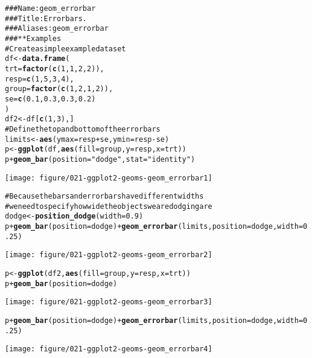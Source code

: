 \documentclass[a4paper,titlepage]{tufte-handout}\usepackage{graphicx, color}
\makeatletter
\def\maxwidth{ %
  \ifdim\Gin@nat@width>\linewidth
    \linewidth
  \else
    \Gin@nat@width
  \fi
}
\newcommand{\hlfunctioncall}[1]{\textcolor[rgb]{0.501960784313725,0,0.329411764705882}{\textbf{#1}}}%
\newcommand{\hlstring}[1]{\textcolor[rgb]{0.6,0.6,1}{#1}}%
\newcommand{\hlcomment}[1]{\textcolor[rgb]{0.180392156862745,0.6,0.341176470588235}{#1}}%
\newenvironment{kframe}{%
 \def\at@end@of@kframe{}%
 \ifinner\ifhmode%
  \def\at@end@of@kframe{\end{minipage}}%
  \begin{minipage}{\columnwidth}%
 \fi\fi%
 \def\FrameCommand##1{\hskip\@totalleftmargin \hskip-\fboxsep
 \colorbox{shadecolor}{##1}\hskip-\fboxsep
     \hskip-\linewidth \hskip-\@totalleftmargin \hskip\columnwidth}%
 \MakeFramed {\advance\hsize-\width
   \@totalleftmargin\z@ \linewidth\hsize
   \@setminipage}}%
 {\par\unskip\endMakeFramed%
 \at@end@of@kframe}
\newenvironment{knitrout}{}{} %
\makeatother
\begin{document}
\begin{knitrout}
\color{fgcolor}\begin{kframe}
\begin{alltt}
\hlcomment{### Name: geom_errorbar}
\hlcomment{### Title: Error bars.}
\hlcomment{### Aliases: geom_errorbar}
\hlcomment{### ** Examples}
\hlcomment{# Create a simple example dataset}
df <- \hlfunctioncall{data.frame}(
  trt = \hlfunctioncall{factor}(\hlfunctioncall{c}(1, 1, 2, 2)),
  resp = \hlfunctioncall{c}(1, 5, 3, 4),
  group = \hlfunctioncall{factor}(\hlfunctioncall{c}(1, 2, 1, 2)),
  se = \hlfunctioncall{c}(0.1, 0.3, 0.3, 0.2)
)
df2 <- df[\hlfunctioncall{c}(1,3),]
\hlcomment{# Define the top and bottom of the errorbars}
limits <- \hlfunctioncall{aes}(ymax = resp + se, ymin=resp - se)
p <- \hlfunctioncall{ggplot}(df, \hlfunctioncall{aes}(fill=group, y=resp, x=trt))
p + \hlfunctioncall{geom_bar}(position=\hlstring{"dodge"}, stat=\hlstring{"identity"})
\end{alltt}
\end{kframe}\texttt{[image: figure/021-ggplot2-geoms-geom\_errorbar1]} \begin{kframe}\begin{alltt}
\hlcomment{# Because the bars and errorbars have different widths}
\hlcomment{# we need to specify how wide the objects we are dodging are}
dodge <- \hlfunctioncall{position_dodge}(width=0.9)
p + \hlfunctioncall{geom_bar}(position=dodge) + \hlfunctioncall{geom_errorbar}(limits, position=dodge, width=0.25)
\end{alltt}
\end{kframe}\texttt{[image: figure/021-ggplot2-geoms-geom\_errorbar2]} \begin{kframe}\begin{alltt}
p <- \hlfunctioncall{ggplot}(df2, \hlfunctioncall{aes}(fill=group, y=resp, x=trt))
p + \hlfunctioncall{geom_bar}(position=dodge)
\end{alltt}
\end{kframe}\texttt{[image: figure/021-ggplot2-geoms-geom\_errorbar3]} \begin{kframe}\begin{alltt}
p + \hlfunctioncall{geom_bar}(position=dodge) + \hlfunctioncall{geom_errorbar}(limits, position=dodge, width=0.25)
\end{alltt}
\end{kframe}\texttt{[image: figure/021-ggplot2-geoms-geom\_errorbar4]} \begin{kframe}\begin{alltt}

\end{alltt}
\end{kframe}
\end{knitrout}
\end{document}
